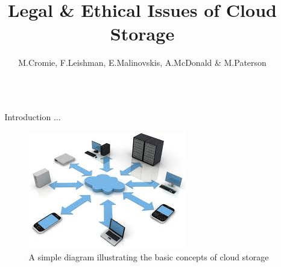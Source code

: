 \documentclass[final]{beamer}
\title{Legal \& Ethical Issues of Cloud Storage} %
\author{M.Cromie, F.Leishman, E.Malinovskis, A.McDonald \& M.Paterson} %
\institute{School of Computing Science, University of Glasgow} %
\newlength{\sepwid}
\newlength{\onecolwid}
\begin{document}

\setlength{\belowcaptionskip}{2ex} %
\setlength\belowdisplayshortskip{2ex} %

\begin{frame}[t] %

\begin{columns}[t] %

\begin{column}{\sepwid}\end{column} %

\begin{column}{\onecolwid} %


\begin{alertblock}{Introduction}
...
\end{alertblock}

\begin{figure}
\includegraphics[width=0.8\linewidth]{storage.jpeg}
\caption{A simple diagram illustrating the basic concepts of cloud storage}
\end{figure}



\end{column}
\end{columns}
\end{frame}
\end{document}
